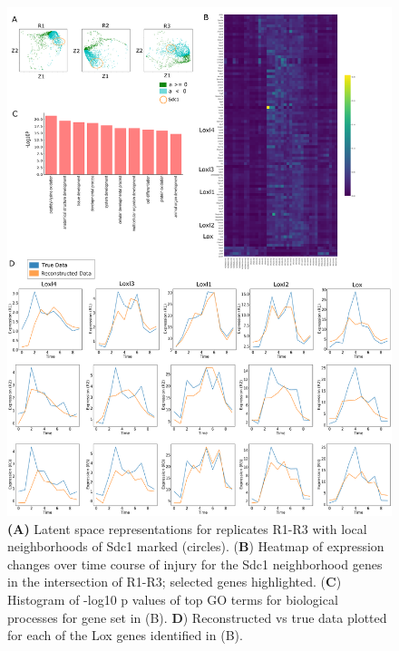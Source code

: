 \begin{center}
\begin{figure}[H]
  \includegraphics[width=\linewidth]{./figures/sdc_sl.png}
    \caption[RVAgene latent space captures biological processes driving concordant gene expression changes (Sdc1).]{{\bf (A)} Latent space representations for replicates R1-R3 with local neighborhoods of Sdc1 marked (circles). ({\bf B}) Heatmap of expression changes over time course of injury for the Sdc1 neighborhood genes in the intersection of R1-R3; selected genes highlighted.  ({\bf C}) Histogram of -log10 p values of top GO terms for biological processes for gene set in (B).
    {\bf D}) Reconstructed vs true data plotted for each of the Lox genes identified in (B).}
  \label{fig:figS7}
\end{figure}
\end{center}

